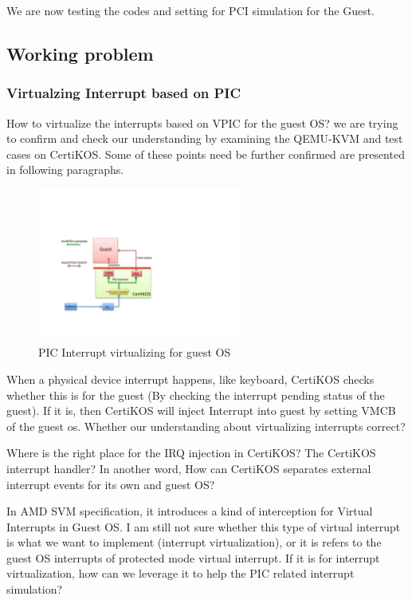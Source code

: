 \documentclass[a4paper,12pt]{article}
\begin{document}
We are now testing the codes and setting for PCI simulation for the Guest.

\subsection{Working problem}

\subsubsection{Virtualzing Interrupt  based on PIC}

How to virtualize the interrupts based on VPIC  for the guest OS? we are trying to confirm and  check our understanding by  examining the QEMU-KVM and test cases on CertiKOS.  Some of these points need be further confirmed are presented in following paragraphs.
  \begin{figure}[!ht]
 \centerline{
 \includegraphics[width=0.6\textwidth]{interrupt_injection}}
 \caption{PIC Interrupt virtualizing for guest OS} \label{fig:interruptinjection}
\end{figure}

When a physical device interrupt happens, like keyboard,  CertiKOS checks whether this is for the guest (By checking the interrupt pending status of the guest). If it is, then CertiKOS will inject Interrupt into guest by setting VMCB of the guest os.   Whether our understanding about virtualizing interrupts correct? 

Where is the right place for the IRQ injection in CertiKOS? The CertiKOS interrupt handler?  In another word, How can CertiKOS separates external interrupt events for its own and guest OS? 

In AMD SVM specification, it introduces a kind of interception for Virtual Interrupts in Guest OS.   I am still not sure whether this type of virtual interrupt is what we want to implement (interrupt virtualization),  or  it is refers to the guest OS  interrupts of protected mode virtual interrupt. If it is for interrupt virtualization, how can we leverage it to help the PIC related interrupt simulation?  
\end{document}
